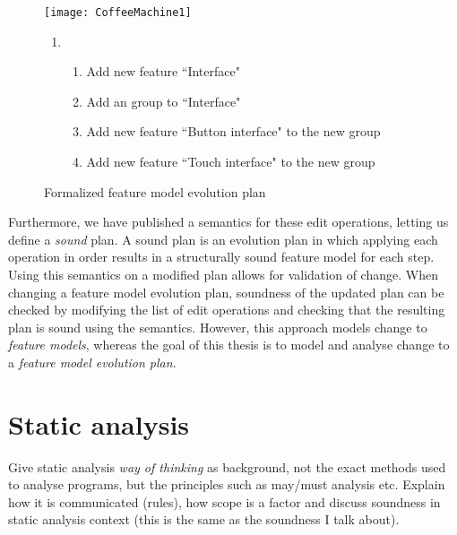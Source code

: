 \begin{figure}
   \begin{center}
      \texttt{[image: CoffeeMachine1]}
      \bigskip

      \scriptsize
      \begin{minipage}{0.7\textwidth}
         \begin{enumerate}[$t_1$]
            \item 
               \begin{enumerate}[ ]
               \item Add new feature ``Interface"
               \item Add an \xortype{} group to ``Interface"
               \item Add new feature ``Button interface" to the new group
               \item Add new feature ``Touch interface"  to the new group
            \end{enumerate}
         \end{enumerate}
      \end{minipage}
      \caption{Formalized feature model evolution plan}
      \label{ex:formal-evolution-plan}
   \end{center}
\end{figure}

Furthermore, we have published a semantics for these edit operations, letting us define a \emph{sound} plan. A sound plan is an evolution plan in which applying each operation in order results in a structurally sound feature model for each step. Using this semantics on a modified plan allows for validation of change. When changing a feature model evolution plan, soundness of the updated plan can be checked by modifying the list of edit operations and checking that the resulting plan is sound using the semantics. However, this approach models change to \emph{feature models}, whereas the goal of this thesis is to model and analyse change to a \emph{feature model evolution plan}.

\section{Static analysis}
\label{sec:static-analysis}

Give static analysis \emph{way of thinking} as background, not the exact methods used to analyse programs, but the principles such as may/must analysis etc. Explain how it is communicated (rules), how scope is a factor and discuss soundness in static analysis context (this is the same as the soundness I talk about). 


